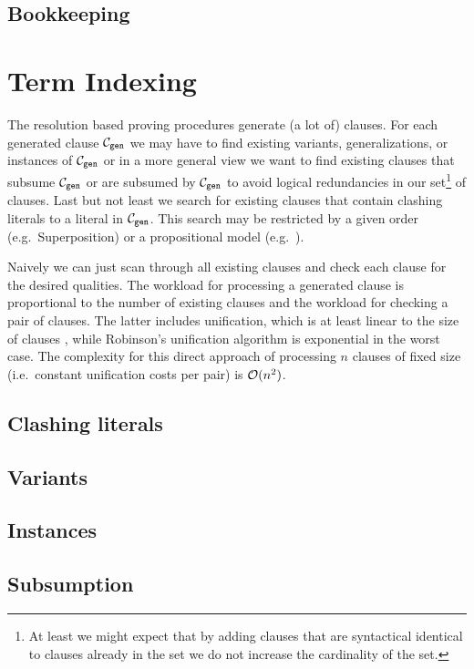 \subsection{Bookkeeping}



\section{Term Indexing}








The resolution based proving procedures generate (a lot of) clauses. 
For each generated clause ${\mathcal C}_\mathtt{gen}$ we may have to find 
existing variants, generalizations, or instances of ${\mathcal C}_\mathtt{gen}$ or in a more general view
we want to find existing clauses that subsume ${\mathcal C}_\mathtt{gen}$ or are subsumed by ${\mathcal C}_\mathtt{gen}$ 
to avoid logical redundancies in our set\footnote{
	At least we might expect that by adding clauses 
	that are syntactical identical to clauses already in the set 
	we do not increase the cardinality of the set. 
} of clauses.
Last but not least we search for existing clauses that contain clashing literals to a literal in ${\mathcal C}_\mathtt{gen}$.
This search may be restricted by a given order (e.g.~Superposition) or a propositional model (e.g.~\InstGenEQ).

Naively we can just scan through all existing clauses and check each clause for the desired qualities. 
	The workload for processing a generated clause is proportional to the number of existing clauses and 
	the workload for checking a pair of clauses. 
	The latter includes unification, which is at least linear to the size of clauses \cite{ALBERT19933},
	while Robinson's unification algorithm \cite{Robinson:1965:MLB:321250.321253} is exponential in the worst case. 
	The complexity for this direct approach of processing $n$ clauses of fixed size (i.e.~constant unification costs per pair) is ${\mathcal O}(n^2)$.









\subsection{Clashing literals}

\subsection{Variants}

\subsection{Instances}

\subsection{Subsumption}



